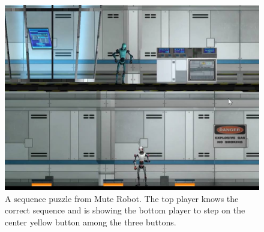 \documentclass{chi-ext}
\begin{document}

\begin{figure}
  \centering
  \includegraphics[width=0.8\linewidth]{figures/Figure2.jpg}
  \caption{A sequence puzzle from Mute Robot. The top player knows the correct sequence and is showing the bottom player to step on the center yellow button among the three buttons.}
  \label{fig:Figure2}
\end{figure}
\end{document}

